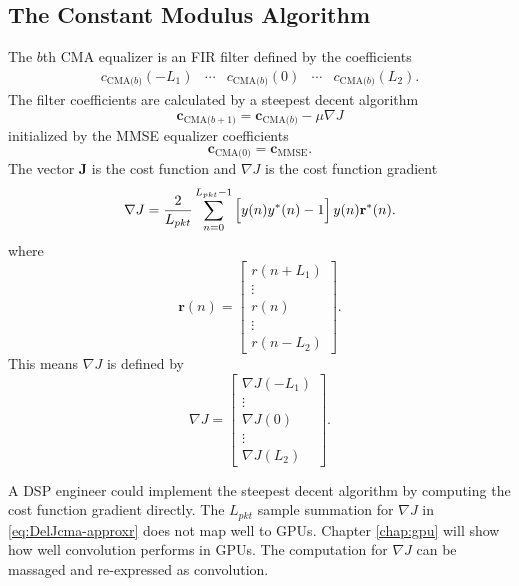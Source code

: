 \subsection{The Constant Modulus Algorithm}
\label{sec:CMA}
The $b$th CMA equalizer is an FIR filter defined by the coefficients
\begin{equation}
\begin{matrix}
c_\text{CMA($b$)}(-L_1) & \cdots & c_\text{CMA($b$)}(0) & \cdots & c_\text{CMA($b$)}(L_2).
\end{matrix}
\end{equation}
The filter coefficients are calculated by a steepest decent algorithm 
\begin{equation}
\mathbf{c}_\text{CMA($b+1$)} = \mathbf{c}_\text{CMA($b$)}-\mu \nabla J
\label{eq:steepest}
\end{equation}
initialized by the MMSE equalizer coefficients
\begin{equation}
\mathbf{c}_\text{CMA($0$)} = \mathbf{c}_\text{MMSE}.
\end{equation}
The vector $\mathbf{J}$ is the cost function and $\nabla J$ is the cost function gradient \cite[eq. (352)]{PAQ-phase1}
\begin{equation}
	\nabla J = \frac{2}{L_{pkt}} \sum_{n=0}^{L_{pkt}-1}
	\left[ \vphantom{\displaystyle\sum}  y(n) y^\ast(n) - 1 \right]
	y(n)  \mathbf{r}^\ast(n).
\label{eq:DelJcma-approxr}
\end{equation}
where
\begin{equation}
\mathbf{r}(n) = \begin{bmatrix} r(n+L_1) \\ \vdots \\ r(n) \\ \vdots \\ r(n-L_2) \end{bmatrix}.
\end{equation}
This means $\nabla J$ is defined by
\begin{equation}
\nabla J = \begin{bmatrix} \nabla J(-L_1) \\ \vdots \\ \nabla J(0) \\ \vdots \\ \nabla J(L_2) \end{bmatrix}.
\end{equation}

A DSP engineer could implement the steepest decent algorithm by computing the cost function gradient directly.
The $L_{pkt}$ sample summation for $\nabla J$ in \eqref{eq:DelJcma-approxr} does not map well to GPUs.
Chapter \ref{chap:gpu} will show how well convolution performs in GPUs.
The computation for $\nabla J$ can be massaged and re-expressed as convolution.

